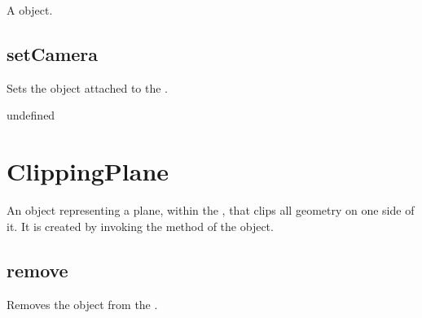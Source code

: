 \documentclass[letterpaper,12pt,english,openany,oneside]{sphinxmanual}
\begin{document}
\label{\detokenize{JS_3D_API:syntax-8}}

\begin{sphinxVerbatim}[commandchars=\\\{\}]
\end{sphinxVerbatim}
\label{\detokenize{JS_3D_API:returns-8}}

A  object.


\subsection{setCamera}
\label{\detokenize{JS_3D_API:setcamera}}
Sets the  object attached to the .

\label{\detokenize{JS_3D_API:syntax-9}}

\begin{sphinxVerbatim}[commandchars=\\\{\}]
\end{sphinxVerbatim}
\label{\detokenize{JS_3D_API:parameters-5}}

\label{\detokenize{JS_3D_API:section-12}}\label{\detokenize{JS_3D_API:returns-9}}

undefined


\section{ClippingPlane}
\label{\detokenize{JS_3D_API:clippingplane}}
An object representing a plane, within the  , that clips all geometry on one side of it. It is created by invoking the  method of the  object.


\subsection{remove}
\label{\detokenize{JS_3D_API:remove}}
Removes the  object from the .

\label{\detokenize{JS_3D_API:syntax-10}}
\end{document}
